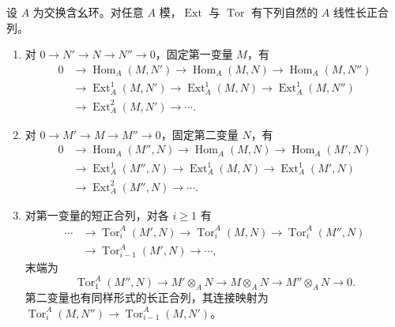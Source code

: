 \begin{proposition}\label{g5:prop:ext-tor-long-exact}
	设 \(A\) 为交换含幺环。对任意 \(A\) 模，\(\operatorname{Ext}\) 与 \(\operatorname{Tor}\) 有下列自然的 \(A\) 线性长正合列。
	\begin{enumerate}
		\item 对 \(0\to N'\to N\to N''\to0\)，固定第一变量 \(M\)，有
		\[
			\begin{aligned}
				0&\longrightarrow\operatorname{Hom}_A(M,N')
				\longrightarrow\operatorname{Hom}_A(M,N)
				\longrightarrow\operatorname{Hom}_A(M,N'')\\
				&\longrightarrow\operatorname{Ext}^1_A(M,N')
				\longrightarrow\operatorname{Ext}^1_A(M,N)
				\longrightarrow\operatorname{Ext}^1_A(M,N'')
				\\
				&\longrightarrow\operatorname{Ext}^2_A(M,N')
				\longrightarrow\cdots.
			\end{aligned}
		\]
		\item 对 \(0\to M'\to M\to M''\to0\)，固定第二变量 \(N\)，有
		\[
			\begin{aligned}
				0&\longrightarrow\operatorname{Hom}_A(M'',N)
				\longrightarrow\operatorname{Hom}_A(M,N)
				\longrightarrow\operatorname{Hom}_A(M',N)\\
				&\longrightarrow\operatorname{Ext}^1_A(M'',N)
				\longrightarrow\operatorname{Ext}^1_A(M,N)
				\longrightarrow\operatorname{Ext}^1_A(M',N)
				\\
				&\longrightarrow\operatorname{Ext}^2_A(M'',N)
				\longrightarrow\cdots.
			\end{aligned}
		\]
		\item 对第一变量的短正合列，对各 \(i\geq1\) 有
		\[
			\begin{aligned}
				\cdots&\longrightarrow\operatorname{Tor}_i^A(M',N)
				\longrightarrow\operatorname{Tor}_i^A(M,N)
				\longrightarrow\operatorname{Tor}_i^A(M'',N)\\
				&\longrightarrow\operatorname{Tor}_{i-1}^A(M',N)
				\longrightarrow\cdots,
			\end{aligned}
		\]
		末端为
		\[
			\operatorname{Tor}_1^A(M'',N)\longrightarrow M'\otimes_A N
			\longrightarrow M\otimes_A N
			\longrightarrow M''\otimes_A N\longrightarrow0.
		\]
		第二变量也有同样形式的长正合列，其连接映射为
		\(\operatorname{Tor}_i^A(M,N'')\to\operatorname{Tor}_{i-1}^A(M,N')\)。
	\end{enumerate}
\end{proposition}
